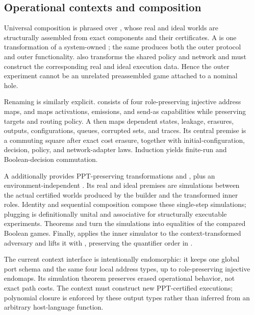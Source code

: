 \subsection{Operational contexts and composition}

Universal composition is phrased over , whose
real and ideal worlds are structurally assembled from exact components and
their certificates.  A  is one transformation of a
system-owned ; the same  produces both the outer
protocol and outer functionality.   also transforms the
shared policy and network and must construct the corresponding real and ideal
execution data.  Hence the outer experiment cannot be an unrelated
preassembled game attached to a nominal hole.

Renaming is similarly explicit.   consists of four
role-preserving injective address maps, and  maps
activations, emissions, and send-as capabilities while preserving targets and
routing policy.  A  then maps dependent states,
leakage, erasures, outputs, configurations, queues, corrupted sets, and traces.
Its central premise is a commuting  square after exact
cost erasure, together with initial-configuration, decision, policy, and
network-adapter laws.  Induction yields finite-run and Boolean-decision
commutation.

A  additionally provides PPT-preserving transformations
 and , plus an
environment-independent .  Its real and ideal premises are
simulations between the actual certified worlds produced by the builder and
the transformed inner roles.  Identity and sequential composition compose
these single-step simulations; plugging is definitionally unital and
associative for structurally executable experiments.  Theorems
 and  turn the simulations into
equalities of the compared Boolean games.  Finally,  applies
the inner simulator to the context-transformed adversary and lifts it with
, preserving the quantifier order in
.

\begin{scopeboundary}
The current context interface is intentionally endomorphic: it keeps one
global port schema and the same four local address types, up to
role-preserving injective endomaps.  Its simulation theorem preserves erased
operational behavior, not exact path costs.  The context must construct new
PPT-certified executions; polynomial closure is enforced by these output
types rather than inferred from an arbitrary host-language function.
\end{scopeboundary}

